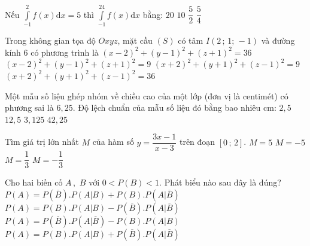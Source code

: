 \begin{ex}%
	Nếu $\displaystyle\int\limits_{-1}^2f(x)\text{d}x=5$ thì $\displaystyle\int\limits_{-1}^24f(x)\text{d}x$ bằng:
	\choice
	{\True $ 20$}
	{$ 10$}
	{$\dfrac{5}{2}$}
	{$\dfrac{5}{4}$}
\end{ex}
\begin{ex}%
	Trong không gian tọa độ $ Oxyz$, mặt cầu $(S)$ có tâm $ I\left(2\,;\,1;\,-1\right)$ và đường kính 6 có phương trình là
	\choice
	{$(x-2)^2+(y-1)^2+(z+1)^2=36$}
	{\True $(x-2)^2+(y-1)^2+(z+1)^2=9$}
	{$(x+2)^2+(y+1)^2+(z-1)^2=9$}
	{$(x+2)^2+(y+1)^2+(z-1)^2=36$}
\end{ex}
\begin{ex}%
	Một mẫu số liệu ghép nhóm về chiều cao của một lớp (đơn vị là centimét) có phương sai là $ 6,25$. Độ lệch chuẩn của mẫu số liệu đó bằng bao nhiêu cm:
	\choice
	{\True $ 2,5$ }
	{$ 12,5$}
	{$ 3,125$}
	{$ 42,25$}
\end{ex}
\begin{ex}%
	Tìm giá trị lớn nhất $ M$ của hàm số $ y=\dfrac{3x-1}{x-3}$ trên đoạn $\left[0\,;\,2\right]$.
	\choice
	{$ M=5$}
	{$ M=-5$}
	{\True $ M=\dfrac{1}{3}$}
	{$ M=-\dfrac{1}{3}$}
\end{ex}
\begin{ex}%
	Cho hai biến cố $ A\,,\,\,B$ với $ 0<P(B)<1.$ Phát biểu nào sau đây là đúng?
	\choice
	{$ P(A)=P\left(\overline{B}\right).P\left(A|B\right)+P(B).P\left(A|\overline{B}\right)$}
	{$ P(A)=P(B).P\left(A|B\right)-P\left(\overline{B}\right).P\left(A|\overline{B}\right)$}
	{$ P(A)=P\left(\overline{B}\right).P\left(A|\overline{B}\right)-P(B).P\left(A|B\right)$}
	{\True $ P(A)=P(B).P\left(A|B\right)+P\left(\overline{B}\right).P\left(A|\overline{B}\right)$}
\end{ex}
